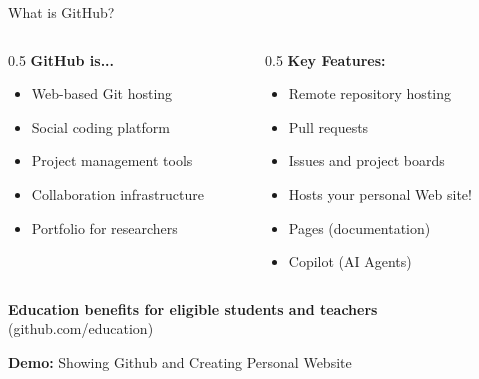 \documentclass[11pt,aspectratio=169]{beamer}
\begin{document}
\begin{frame}{What is GitHub?}
\begin{columns}[t]
\begin{column}[t]{0.5\textwidth}
\textbf{GitHub is...}
\begin{itemize}
    \item Web-based Git hosting
    \item Social coding platform
    \item Project management tools
    \item Collaboration infrastructure
    \item Portfolio for researchers
\end{itemize}
\end{column}

\begin{column}[t]{0.5\textwidth}
\textbf{Key Features:}
\begin{itemize}
    \item Remote repository hosting
    \item Pull requests
    \item Issues and project boards
    \item Hosts your personal Web site!
    \item Pages (documentation)
    \item Copilot (AI Agents)
\end{itemize}
\end{column}
\end{columns}

\vspace{0.5cm}
\textbf{Education benefits for eligible students and teachers} (github.com/education)

\vspace{0.3cm}
\textbf{Demo:} Showing Github and Creating Personal Website
\end{frame}
\end{document}
